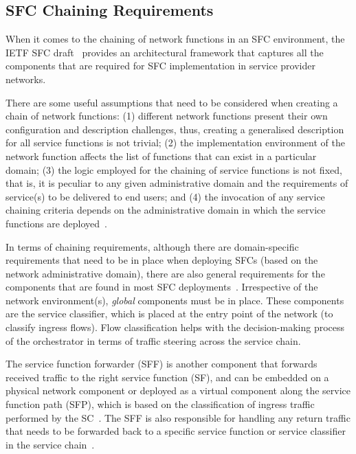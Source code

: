 \documentclass[futureinternet,review,accept,pdftex,moreauthors]{Definitions/mdpi}
\begin{document}
\subsection{SFC Chaining Requirements}
\label{SFC-requirements}
When it comes to the chaining of network functions in an SFC environment, the IETF SFC draft~\cite{quinn2014service} provides an architectural framework that captures all the components that are required for SFC implementation in service provider networks.

There are some useful assumptions that need to be considered when creating a chain of network functions: (1) different network functions present their own configuration and description challenges, thus, creating a generalised description for all service functions is not trivial; (2) the implementation environment of the network function affects the list of functions that can exist in a particular domain; (3) the logic employed for the chaining of service functions is not fixed, that is, it is peculiar to any given administrative domain and the requirements of service(s) to be delivered to end users; and (4) the invocation of any service chaining criteria depends on the administrative domain in which the service functions are deployed~\cite{quinn2014service}. 


In terms of chaining requirements, although there are domain-specific requirements that need to be in place when deploying SFCs (based on the network administrative domain), there are also general requirements for the components that are found in most SFC deployments~\cite{gasparakis2016evaluating}. Irrespective of the network environment(s), {\textit{global}} %
 components must be in place. These components are the service classifier, which is placed at the entry point of the network (to classify ingress flows). Flow classification helps with the decision-making process of the orchestrator in terms of traffic steering across the service chain.

The service function forwarder (SFF) is another component that forwards received traffic to the right service function (SF), and can be embedded on a physical network component or deployed as a virtual component along the service function path (SFP), which is based on the classification of ingress traffic performed by the SC~\cite{halpern2015service}. The SFF is also responsible for handling any return traffic that needs to be forwarded back to a specific service function or service classifier in the service chain~\cite{quinn2014service}.
\end{document}
